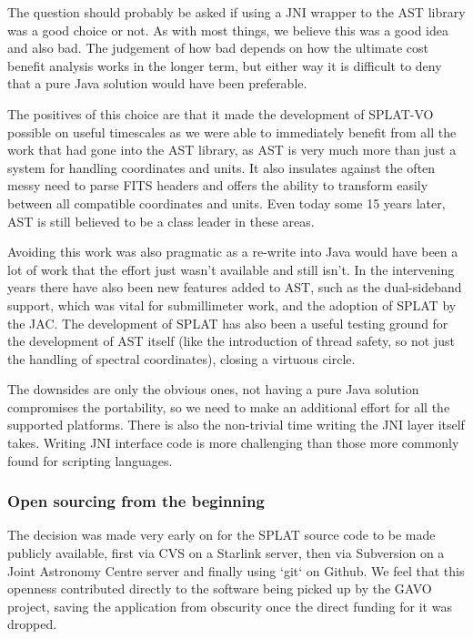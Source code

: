 \documentclass[final,authoryear,5p,times,twocolumn]{elsarticle}
\begin{document}
The question should probably be asked if using a JNI wrapper to the
AST library was a good choice or not. As with most things, we believe
this was a good idea and also bad. The judgement of how bad depends on
how the ultimate cost benefit analysis works in the longer term, but
either way it is difficult to deny that a pure Java solution would
have been preferable.

The positives of this choice are that it made the development of
SPLAT-VO possible on useful timescales as we were able to immediately
benefit from all the work that had gone into the AST library, as AST
is very much more than just a system for handling coordinates and
units. It also insulates against the often messy need to parse FITS
headers and offers the ability to transform easily between all
compatible coordinates and units. Even today some 15 years later, AST
is still believed to be a class leader in these areas.

Avoiding this work was also pragmatic as a re-write into Java would
have been a lot of work that the effort just wasn't available and
still isn't. In the intervening years there have also been new
features added to AST, such as the dual-sideband support, which was
vital for submillimeter work, and the adoption of SPLAT by the
JAC. The development of SPLAT has also been a useful testing ground
for the development of AST itself (like the introduction of thread
safety, so not just the handling of spectral coordinates), closing a
virtuous circle.

The downsides are only the obvious ones, not having a pure Java
solution compromises the portability, so we need to make an additional
effort for all the supported platforms. There is also the non-trivial
time writing the JNI layer itself takes. Writing JNI interface code is
more challenging than those more commonly found for scripting
languages.

\subsubsection{Open sourcing from the beginning}

The decision was made very early on for the SPLAT source code to be
made publicly available, first via CVS on a Starlink server, then via
Subversion on a Joint Astronomy Centre server and finally using `git`
on Github. We feel that this openness contributed directly to the
software being picked up by the GAVO project, saving the application
from obscurity once the direct funding for it was dropped.
\end{document}
